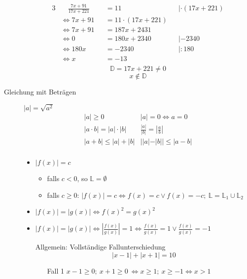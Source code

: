 \begin{description}
    \begin{alignat*}{3}
        & \quad \frac{7x+91}{17x+221} &  & = 11                 &  & | \cdot (17x + 221) \\
        & \Leftrightarrow 7x + 91     &  & = 11 \cdot (17x+221)                          \\
        & \Leftrightarrow 7x + 91     &  & = 187x + 2431                                 \\
        & \Leftrightarrow 0           &  & = 180x +2340         &  & |-2340              \\
        & \Leftrightarrow 180x        &  & = -2340              &  & | :180              \\
        & \Leftrightarrow x           &  & = -13                                         \\
    \end{alignat*}
    $$\mathbb{D} = 17x+221 \not = 0$$
    $$x \not \in \mathbb{D}$$
    \item[Gleichung mit Beträgen] $|a| = \sqrt{a^2}$
    $$\begin{array}{ll}
          |a| \geq 0                  & |a| = 0 \Leftrightarrow a = 0              \\
          |a \cdot b| = |a| \cdot |b| & \frac{|a|}{|b|} = \left|\frac{a}{b}\right| \\
          |a+b| \leq  |a| + |b|       & ||a|-|b|| \leq |a-b|                       \\
    \end{array}$$
    \begin{itemize}
        \item $|f(x)| = c$ \
        \begin{itemize}
            \item falls $c<0$, so $\mathbb{L}= \emptyset$
            \item falls $c\geq0$: $|f(x)| = c \Leftrightarrow f(x) = c \vee f(x) = -c;\ \mathbb{L} = \mathbb{L}_1 \cup \mathbb{L}_2$
        \end{itemize}
        \item $|f(x)| = |g(x)| \Leftrightarrow f(x)^2 = g(x)^2$
        \item $|f(x)| = |g(x)| \Leftrightarrow \left|\frac{f(x)}{g(x)}\right| = 1 \Leftrightarrow \frac{f(x)}{g(x)} = 1 \vee \frac{f(x)}{g(x)} = -1$
        \item[Allgemein:] Vollständige Fallunterschiedung
        $$|x-1|+|x+1|=10$$
        \begin{itemize}
            \item[Fall 1] $x-1 \geq 0;\ x+1 \geq 0 \ \Leftrightarrow x \geq 1;\ x\geq -1 \Leftrightarrow x>1$

\end{itemize}
\end{itemize}
\end{description}

